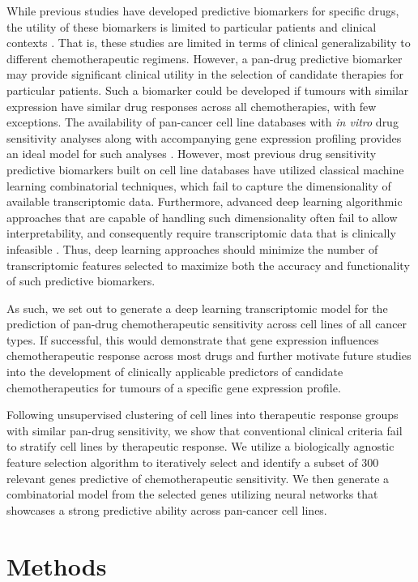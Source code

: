 \documentclass[10pt, letterpaper]{article}
\begin{document}
\begin{multicols*}{2}
While previous studies have developed predictive biomarkers for specific drugs, the utility of these biomarkers is limited to particular patients and clinical contexts \cite{drug_sense}. That is, these studies are limited in terms of clinical generalizability to different chemotherapeutic regimens. However, a pan-drug predictive biomarker may provide significant clinical utility in the selection of candidate therapies for particular patients. Such a biomarker could be developed if tumours with similar expression have similar drug responses across all chemotherapies, with few exceptions. The availability of pan-cancer cell line databases with \textit{in vitro} drug sensitivity analyses along with accompanying gene expression profiling provides an ideal model for such analyses \cite{gdsc}. However, most previous drug sensitivity predictive biomarkers built on cell line databases have utilized classical machine learning combinatorial techniques, which fail to capture the dimensionality of available transcriptomic data. Furthermore, advanced deep learning algorithmic approaches that are capable of handling such dimensionality often fail to allow interpretability, and consequently require transcriptomic data that is clinically infeasible \cite{ml_oncol}. Thus, deep learning approaches should minimize the number of transcriptomic features selected to maximize both the accuracy and functionality of such predictive biomarkers.

As such, we set out to generate a deep learning transcriptomic model for the prediction of pan-drug chemotherapeutic sensitivity across cell lines of all cancer types. If successful, this would demonstrate that gene expression influences chemotherapeutic response across most drugs and further motivate future studies into the development of clinically applicable predictors of candidate chemotherapeutics for tumours of a specific gene expression profile.

Following unsupervised clustering of cell lines into therapeutic response groups with similar pan-drug sensitivity, we show that conventional clinical criteria fail to stratify cell lines by therapeutic response. We utilize a biologically agnostic feature selection algorithm to iteratively select and identify a subset of 300 relevant genes predictive of chemotherapeutic sensitivity. We then generate a combinatorial model from the selected genes utilizing neural networks that showcases a strong predictive ability across pan-cancer cell lines.


\section{Methods}


\end{multicols*}
\end{document}
